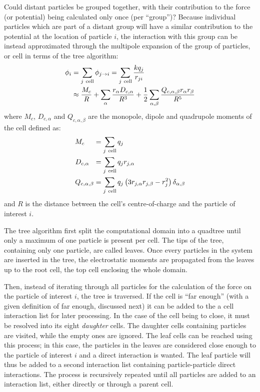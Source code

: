 Could distant particles be grouped together, with their contribution to the
force (or potential) being calculated only once (per ``group'')? Because
individual particles which are part of a distant group will have a similar
contribution to the potential at the location of particle $i$, the interaction
with this group can be instead approximated through the multipole
expansion\cite{Gibbon2002} of the group of particles, or cell in terms of the
tree algorithm:
\begin{align}
\phi_i & = \sum_{j~\textrm{cell}} \phi_{j \rightarrow i} = \sum_{j~{\rm cell}}
\frac{k q_j}{r_{ji}} \\
& \approx \frac{M_{c}}{R}
+ \sum_{\alpha} \frac{r_{\alpha} D_{c,\alpha}}{R^3}
+ \frac{1}{2} \sum_{\alpha,\beta} \frac{
        Q_{c,\alpha,\beta} r_{\alpha} r_{\beta}
    }{R^5}
\end{align}
where $M_{c}$, $D_{c,\alpha}$ and $Q_{c,\alpha,\beta}$ are the monopole, dipole
and quadrupole moments of the cell defined as:
\begin{subequations}
\begin{align}
M_{c}           ~~~~& = \sum_{j~\textrm{cell}} q_{j} \\
D_{c,\alpha}      ~~& = \sum_{j~\textrm{cell}} q_{j} r_{j,\alpha} \\
Q_{c,\alpha,\beta}  & = \sum_{j~\textrm{cell}} q_{j} \left( 3 r_{j,\alpha}
r_{j,\beta} - r_{j}^2 \right) \delta_{\alpha,\beta}
\end{align}
\label{eqn:tree:moments}
\end{subequations}
and $R$ is the distance between the cell's centre-of-charge and the
particle of interest $i$.


The tree algorithm first split the computational domain into a quadtree until
only a maximum of one particle is present per cell. The tips of the tree,
containing only one particle, are called leaves. Once every particles in the
system are inserted in the tree, the electrostatic moments are propagated from
the leaves up to the root cell, the top cell enclosing the whole domain.

Then, instead of iterating through all particles for the calculation of the
force on the particle of interest $i$, the tree is traversed. If the cell is
``far enough'' (with a given definition of far enough, discussed next) it can
be added to the a cell interaction list for later processing. In the case of
the cell being to close, it must be resolved into its  eight \textit{daughter}
cells. The daughter cells containing particles are visited, while the empty
ones are ignored. The leaf cells can be reached using this process; in this
case, the particles in the leaves are considered close enough to the particle
of interest $i$ and a direct interaction is wanted. The leaf particle will thus
be added to a second interaction list containing particle-particle direct
interactions. The process is recursively repeated until all particles
are added to an interaction list, either directly or through a parent cell.

